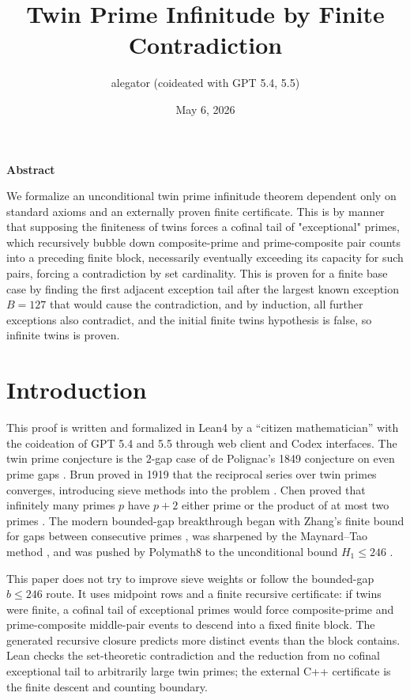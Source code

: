 \documentclass[11pt]{article}
\title{Twin Prime Infinitude by Finite Contradiction}
\author{alegator (coideated with GPT 5.4, 5.5)}
\date{May 6, 2026}
\begin{document}
\maketitle

\begin{center}
\textbf{Abstract}
\end{center}
\noindent
We formalize an unconditional twin prime infinitude theorem dependent only on
standard axioms and an externally proven finite certificate. This is by manner
that supposing the finiteness of twins forces a cofinal tail of
"exceptional" primes, which recursively bubble down composite-prime and
prime-composite pair counts into a preceding finite block, necessarily
eventually exceeding its capacity for such pairs, forcing a contradiction by
set cardinality. This is proven for a finite base case by finding the first
adjacent exception tail after the largest known exception \(B=127\) that would
cause the contradiction, and by induction, all further exceptions also
contradict, and the initial finite twins hypothesis is false, so infinite
twins is proven.

\section{Introduction}
\noindent
This proof is written and formalized in Lean4 by a ``citizen mathematician''
with the coideation of GPT 5.4 and 5.5 through web client and Codex interfaces.
The twin prime conjecture is the \(2\)-gap case of de Polignac's 1849
conjecture on even prime gaps \cite{Polignac1849}.  Brun proved in 1919 that
the reciprocal series over twin primes converges, introducing sieve methods
into the problem \cite{Brun1919}.  Chen proved that infinitely many primes
\(p\) have \(p+2\) either prime or the product of at most two primes
\cite{Chen1973}.  The modern bounded-gap breakthrough began with Zhang's
finite bound for gaps between consecutive primes \cite{Zhang2014}, was
sharpened by the Maynard--Tao method \cite{Maynard2015}, and was pushed by
Polymath8 to the unconditional bound \(H_1\le246\) \cite{Polymath8b2014}.

\noindent
This paper does not try to improve sieve weights or follow the bounded-gap
\(b\le246\) route.  It uses midpoint rows and a finite recursive certificate:
if twins were finite, a cofinal tail of exceptional primes would force
composite-prime and prime-composite middle-pair events to descend into a fixed
finite block.  The generated recursive closure predicts more distinct events
than the block contains.  Lean checks the set-theoretic contradiction and the
reduction from no cofinal exceptional tail to arbitrarily large twin primes;
the external C++ certificate is the finite descent and counting boundary.
\end{document}
